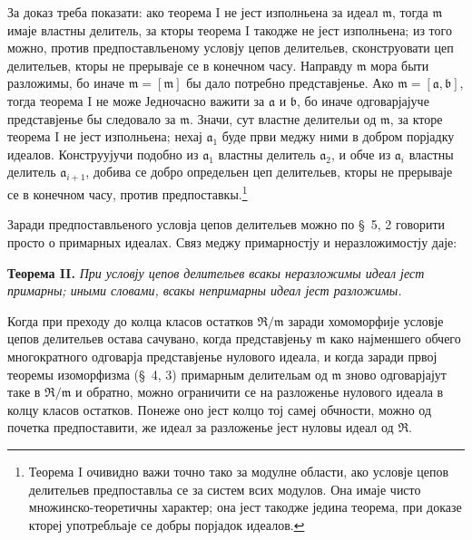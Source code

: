 \documentclass[11pt]{article}
\providecommand{\mR}{\mathfrak{R}}
\providecommand{\ma}{\mathfrak{a}}
\providecommand{\mb}{\mathfrak{b}}
\providecommand{\mm}{\mathfrak{m}}
\begin{document}
За доказ треба показати: ако теорема I не јест изполньена за идеал $\mm$, тогда $\mm$ имаје властны делитель, за кторы теорема I такодже не јест изполньена; из того можно, против предпоставльеному условју цепов делительев, сконструовати цеп делительев, кторы не прерываје се в конечном часу. Направду $\mm$ мора быти разложимы, бо иначе $\mm=[\mm]$ бы дало потребно представјенье. Ако $\mm=[\ma,\mb]$, тогда теорема I не може Једночасно важити за $\ma$ и $\mb$, бо иначе одговарјајуче представјенье бы следовало за $\mm$. Значи, сут властне делительи од $\mm$, за кторе теорема I не јест изполньена; нехај $\ma_1$ буде први меджу ними в добром порјадку идеалов. Конструујучи подобно из $\ma_1$ властны делитель $\ma_2$, и обче из $\ma_i$ властны делитель $\ma_{i+1}$, добива се добро определьен цеп делительев, кторы не прерываје се в конечном часу, против предпоставкы.\footnote{Теорема I очивидно важи точно тако за модулне области, ако условје цепов делительев предпоставльа се за систем всих модулов. Она имаје чисто множинско-теоретичны характер; она јест такодже једина теорема, при доказе ктореј употребльаје се добры порјадок идеалов.}

Заради предпоставльеного условја цепов делительев можно по \S~5, 2 говорити просто о примарных идеалах. Связ меджу примарностју и неразложимостју даје:

\textbf{Теорема II.} \emph{При условју цепов делительев всакы неразложимы идеал јест примарны; иными словами, всакы непримарны идеал јест разложимы.}

Когда при преходу до колца класов остатков $\mR/\mm$ заради хомоморфије условје цепов делительев остава сачувано, когда представјеньу $\mm$ како најменшего обчего многократного одговарја представјенье нулового идеала, и когда заради првој теоремы изоморфизма (\S~4, 3) примарным делительам од $\mm$ зново одговарјајут таке в $\mR/\mm$ и обратно, можно ограничити се на разложенье нулового идеала в колцу класов остатков. Понеже оно јест колцо тој самеј обчности, можно од почетка предпоставити, же идеал за разложенье јест нуловы идеал од $\mR$.
\end{document}
